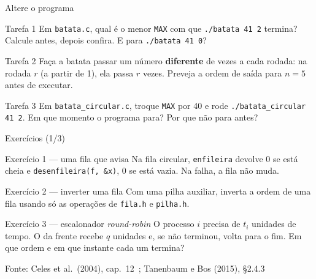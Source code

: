 \documentclass[aspectratio=169]{beamer}
\newcommand{\fonte}[1]{\vfill\hfill{\scriptsize\textcolor{UFSGray}{Fonte: #1}}}
\begin{document}
\begin{frame}{Altere o programa}
  \small
  \begin{block}{Tarefa 1}
    Em \texttt{batata.c}, qual é o menor \texttt{MAX} com que
    \texttt{./batata 41 2} termina? Calcule antes, depois confira. E para
    \texttt{./batata 41 0}?
  \end{block}
  \begin{block}{Tarefa 2}
    Faça a batata passar um número \textbf{diferente} de vezes a cada rodada:
    na rodada $r$ (a partir de 1), ela passa $r$ vezes. Preveja a ordem de
    saída para $n = 5$ antes de executar.
  \end{block}
  \begin{block}{Tarefa 3}
    Em \texttt{batata\_circular.c}, troque \texttt{MAX} por 40 e rode
    \texttt{./batata\_circular 41 2}. Em que momento o programa para? Por
    que não para antes?
  \end{block}
\end{frame}

\begin{frame}{Exercícios (1/3)}
  \footnotesize
  \begin{block}{Exercício 1 --- uma fila que avisa}
    Na fila circular, \texttt{enfileira} devolve 0 se está cheia e
    \texttt{desenfileira(f, \&x)}, 0 se está vazia. Na falha, a fila não muda.
  \end{block}
  \begin{block}{Exercício 2 --- inverter uma fila}
    Com uma pilha auxiliar, inverta a ordem de uma fila usando só as
    operações de \texttt{fila.h} e \texttt{pilha.h}.
  \end{block}
  \begin{block}{Exercício 3 --- escalonador \emph{round-robin}}
    O processo $i$ precisa de $t_i$ unidades de tempo. O da frente recebe
    $q$ unidades e, se não terminou, volta para o fim. Em que ordem e em
    que instante cada um termina?
  \end{block}
  \fonte{Celes et al.\ (2004), cap.~12~\cite{celes2004introducao};
    Tanenbaum e Bos (2015), §2.4.3~\cite{tanenbaum2015modern}}
\end{frame}
\end{document}
